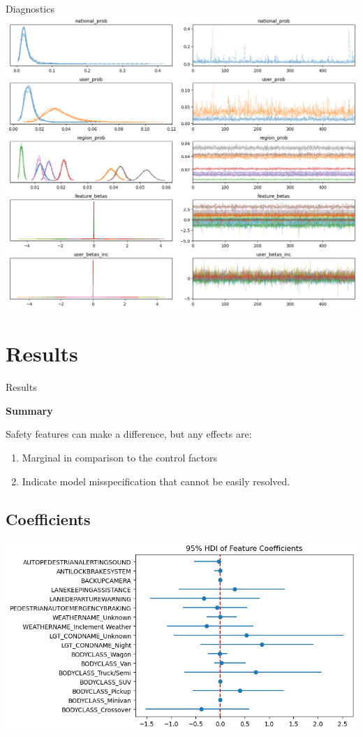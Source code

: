 \documentclass{beamer}
\begin{document}
\begin{frame}{Diagnostics}
    \centering
    \includegraphics[width=0.7\linewidth]{paper/images/traceplot.png}
\end{frame}


\section{Results}
\begin{frame}{Results}

\textbf{Summary}

Safety features can make a difference, but any effects are:

\begin{enumerate}
    \item Marginal in comparison to the control factors
    \item Indicate model misspecification that cannot be easily resolved.
\end{enumerate}

\end{frame}


\subsection{Coefficients}
\begin{frame}
    \centering
    \includegraphics[width=\linewidth]{paper/images/all_users_coefficients.png}
\end{frame}
\end{document}
